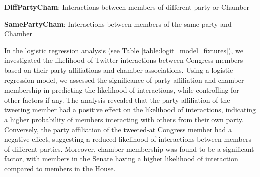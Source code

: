 \documentclass[11pt]{article}
\begin{document}
\begin{table}[h]
\caption{Number of Twitter interactions between Congress members by Party, Chamber, and whether they interacted with members of the same or a different party and chamber.}
\label{table:interaction_counts_within_across_party_chamber}
\begin{threeparttable}
\renewcommand{\TPTminimum}{\linewidth}
\begin{tablenotes}
\footnotesize
\item \textbf{DiffPartyCham}: Interactions between members of different party or Chamber
\item \textbf{SamePartyCham}: Interactions between members of the same party and Chamber
\end{tablenotes}
\end{threeparttable}
\end{table}


In the logistic regression analysis (see Table {}\ref{table:logit_model_fixtures}), we investigated the likelihood of Twitter interactions between Congress members based on their party affiliations and chamber associations. Using a logistic regression model, we assessed the significance of party affiliation and chamber membership in predicting the likelihood of interactions, while controlling for other factors if any. The analysis revealed that the party affiliation of the tweeting member had a positive effect on the likelihood of interactions, indicating a higher probability of members interacting with others from their own party. Conversely, the party affiliation of the tweeted-at Congress member had a negative effect, suggesting a reduced likelihood of interactions between members of different parties. Moreover, chamber membership was found to be a significant factor, with members in the Senate having a higher likelihood of interaction compared to members in the House.
\end{document}
